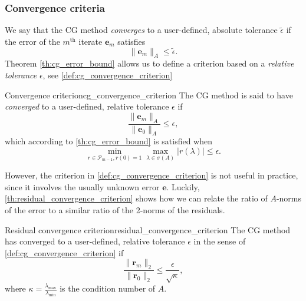 \subsubsection{Convergence criteria}\label{sec:cg_convergence_criteria}
We say that the CG method \textit{converges} to a user-defined, absolute tolerance $\tilde{\epsilon}$ if the error of the $m^{\text{th}}$ iterate $\mathbf{e}_m$ satisfies
\[
  \|\mathbf{e}_m\|_A \leq \tilde{\epsilon}.
\]
Theorem \ref{th:cg_error_bound} allows us to define a criterion based on a \textit{relative tolerance} $\epsilon$, see \cref{def:cg_convergence_criterion}
\begin{fancydef}{Convergence criterion}{cg_convergence_criterion}
  The CG method is said to have \textit{converged} to a user-defined, relative tolerance $\epsilon$ if
  \begin{equation*}
    \frac{\|\mathbf{e}_m\|_A}{\|\mathbf{e}_0\|_A} \leq \epsilon,
  \end{equation*}
  which according to \cref{th:cg_error_bound} is satisfied when
  \begin{equation}
    \min_{r \in \mathcal{P}_{m-1}, r(0) = 1} \max_{\lambda \in \sigma(A)} |r(\lambda)| \leq \epsilon.
    \label{eq:cg_convergence_criterion}
  \end{equation}
\end{fancydef}
However, the criterion in \cref{def:cg_convergence_criterion} is not useful in practice, since it involves the usually unknown error $\mathbf{e}$. Luckily, \cref{th:residual_convergence_criterion} shows how we can relate the ratio of $A$-norms of the error to a similar ratio of the 2-norms of the residuals.
\begin{fancyth}{Residual convergence criterion}{residual_convergence_criterion}
  The CG method has converged to a user-defined, relative tolerance $\epsilon$ in the sense of \cref{def:cg_convergence_criterion} if
  \begin{equation}
    \frac{\|\mathbf{r}_m\|_2}{\|\mathbf{r}_0\|_2} \leq \frac{\epsilon}{\sqrt{\kappa}},
    \label{eq:residual_convergence_criterion}
  \end{equation}
  where $\kappa = \frac{\lambda_{\text{max}}}{\lambda_{\text{min}}}$ is the condition number of $A$.
\end{fancyth}
